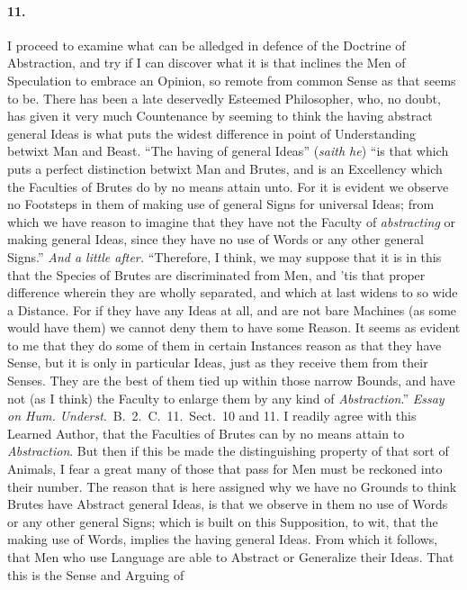 \documentclass[]{article}
\newenvironment{sectionbody}{}{}
\begin{document}
\begin{sectionbody}
\paragraph{11.} I proceed to examine what can be alledged in defence of the
Doctrine of Abstraction, and try if I can discover what it is
that inclines the Men of Speculation to embrace an Opinion, so
remote from common Sense as that seems to be.  There has been a
late deservedly Esteemed Philosopher, who, no doubt, has given it
very much Countenance by seeming to think the having abstract
general Ideas is what puts the widest difference in point of
Understanding betwixt Man and Beast. ``The having of general
Ideas'' (\emph{saith he}) ``is that which puts a perfect
distinction betwixt Man and Brutes, and is an Excellency which
the Faculties of Brutes do by no means attain unto.  For it is
evident we observe no Footsteps in them of making use of general
Signs for universal Ideas; from which we have reason to imagine
that they have not the Faculty of \emph{abstracting} or making
general Ideas, since they have no use of Words or any other
general Signs.'' \emph{And a little after.} ``Therefore, I
think, we may suppose that it is in this that the Species of
Brutes are discriminated from Men, and 'tis that proper
difference wherein they are wholly separated, and which at last
widens to so wide a Distance.  For if they have any Ideas at
all, and are not bare Machines (as some would have them) we
cannot deny them to have some Reason.  It seems as evident to me
that they do some of them in certain Instances reason as that
they have Sense, but it is only in particular Ideas, just as they
receive them from their Senses.  They are the best of them tied
up within those narrow Bounds, and have not (as I think) the
Faculty to enlarge them by any kind of \emph{Abstraction}.''
\emph{Essay on Hum.  Underst}.\ B.~2.\ C.~11.\ Sect.\ 10 and 11.
I readily agree with this Learned Author, that the Faculties of
Brutes can by no means attain to \emph{Abstraction}.  But then
if this be made the distinguishing property of that sort of
Animals, I fear a great many of those that pass for Men must be
reckoned into their number.  The reason that is here assigned why
we have no Grounds to think Brutes have Abstract general Ideas,
is that we observe in them no use of Words or any other general
Signs; which is built on this Supposition, to wit, that the
making use of Words, implies the having general Ideas.  From
which it follows, that Men who use Language are able to Abstract
or Generalize their Ideas.  That this is the Sense and Arguing of

\end{sectionbody}
\end{document}
